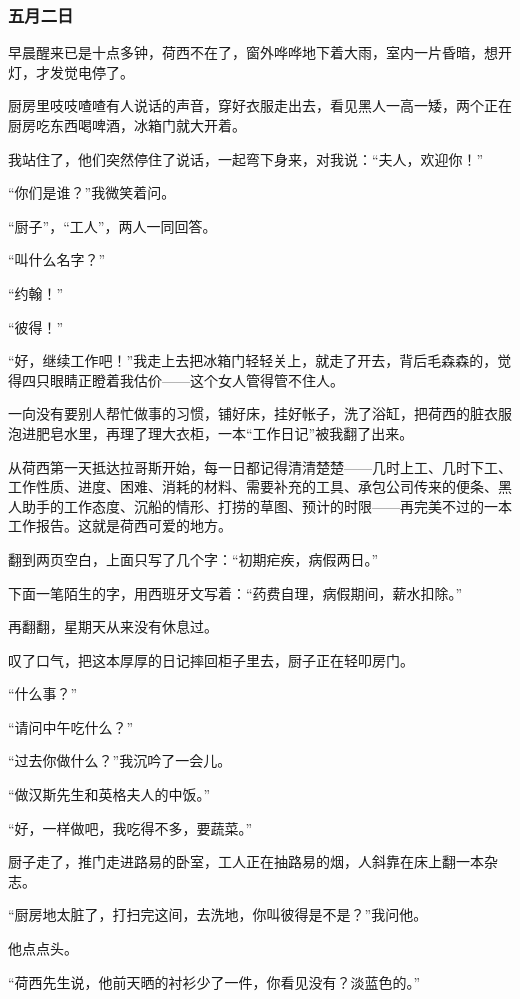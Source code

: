 \subsubsection{五月二日}
\par 早晨醒来已是十点多钟，荷西不在了，窗外哗哗地下着大雨，室内一片昏暗，想开灯，才发觉电停了。
\par 厨房里吱吱喳喳有人说话的声音，穿好衣服走出去，看见黑人一高一矮，两个正在厨房吃东西喝啤酒，冰箱门就大开着。
\par 我站住了，他们突然停住了说话，一起弯下身来，对我说：“夫人，欢迎你！”
\par “你们是谁？”我微笑着问。
\par “厨子”，“工人”，两人一同回答。
\par “叫什么名字？”
\par “约翰！”
\par “彼得！”
\par “好，继续工作吧！”我走上去把冰箱门轻轻关上，就走了开去，背后毛森森的，觉得四只眼睛正瞪着我估价——这个女人管得管不住人。
\par 一向没有要别人帮忙做事的习惯，铺好床，挂好帐子，洗了浴缸，把荷西的脏衣服泡进肥皂水里，再理了理大衣柜，一本“工作日记”被我翻了出来。
\par 从荷西第一天抵达拉哥斯开始，每一日都记得清清楚楚——几时上工、几时下工、工作性质、进度、困难、消耗的材料、需要补充的工具、承包公司传来的便条、黑人助手的工作态度、沉船的情形、打捞的草图、预计的时限——再完美不过的一本工作报告。这就是荷西可爱的地方。
\par 翻到两页空白，上面只写了几个字：“初期疟疾，病假两日。”
\par 下面一笔陌生的字，用西班牙文写着：“药费自理，病假期间，薪水扣除。”
\par 再翻翻，星期天从来没有休息过。
\par 叹了口气，把这本厚厚的日记摔回柜子里去，厨子正在轻叩房门。
\par “什么事？”
\par “请问中午吃什么？”
\par “过去你做什么？”我沉吟了一会儿。
\par “做汉斯先生和英格夫人的中饭。”
\par “好，一样做吧，我吃得不多，要蔬菜。”
\par 厨子走了，推门走进路易的卧室，工人正在抽路易的烟，人斜靠在床上翻一本杂志。
\par “厨房地太脏了，打扫完这间，去洗地，你叫彼得是不是？”我问他。
\par 他点点头。
\par “荷西先生说，他前天晒的衬衫少了一件，你看见没有？淡蓝色的。”
